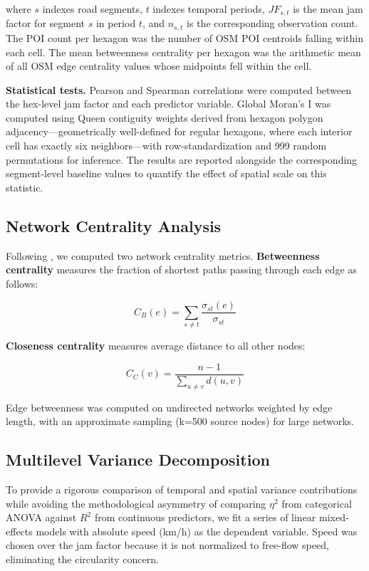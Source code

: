 \documentclass[review,authoryear]{elsarticle}
\begin{document}
where $s$ indexes road segments, $t$ indexes temporal periods, $JF_{s,t}$ is the mean jam factor for segment $s$ in period $t$, and $n_{s,t}$ is the corresponding observation count. The POI count per hexagon was the number of OSM POI centroids falling within each cell. The mean betweenness centrality per hexagon was the arithmetic mean of all OSM edge centrality values whose midpoints fell within the cell.

\textbf{Statistical tests.} Pearson and Spearman correlations were computed between the hex-level jam factor and each predictor variable. Global Moran's I was computed using Queen contiguity weights derived from hexagon polygon adjacency---geometrically well-defined for regular hexagons, where each interior cell has exactly six neighbors---with row-standardization and 999 random permutations for inference. The results are reported alongside the corresponding segment-level baseline values to quantify the effect of spatial scale on this statistic.

\subsection{Network Centrality Analysis}

Following \citet{Boeing2017}, we computed two network centrality metrics. \textbf{Betweenness centrality} measures the fraction of shortest paths passing through each edge as follows:

\[C_B(e) = \sum_{s \neq t} \frac{\sigma_{st}(e)}{\sigma_{st}}\]

\textbf{Closeness centrality} measures average distance to all other nodes:

\[C_C(v) = \frac{n-1}{\sum_{u \neq v} d(u,v)}\]

Edge betweenness was computed on undirected networks weighted by edge length, with an approximate sampling (k=500 source nodes) for large networks.

\subsection{Multilevel Variance Decomposition}

To provide a rigorous comparison of temporal and spatial variance contributions while avoiding the methodological asymmetry of comparing $\eta^2$ from categorical ANOVA against $R^2$ from continuous predictors, we fit a series of linear mixed-effects models with absolute speed (km/h) as the dependent variable. Speed was chosen over the jam factor because it is not normalized to free-flow speed, eliminating the circularity concern.
\end{document}
